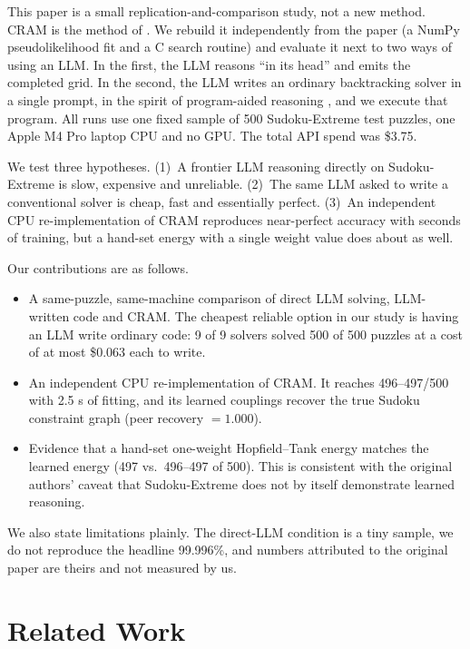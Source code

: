 \documentclass{article} %
\begin{document}
This paper is a small replication-and-comparison study, not a new method. CRAM is the method of \citet{hoover2026cram}. We rebuild it independently from the paper (a NumPy pseudolikelihood fit and a C search routine) and evaluate it next to two ways of using an LLM. In the first, the LLM reasons ``in its head'' and emits the completed grid. In the second, the LLM writes an ordinary backtracking solver in a single prompt, in the spirit of program-aided reasoning \citep{gao2023pal,chen2022pot}, and we execute that program. All runs use one fixed sample of 500 Sudoku-Extreme test puzzles, one Apple M4 Pro laptop CPU and no GPU. The total API spend was \$3.75.

We test three hypotheses. (1)~A frontier LLM reasoning directly on Sudoku-Extreme is slow, expensive and unreliable. (2)~The same LLM asked to write a conventional solver is cheap, fast and essentially perfect. (3)~An independent CPU re-implementation of CRAM reproduces near-perfect accuracy with seconds of training, but a hand-set energy with a single weight value does about as well.

Our contributions are as follows.
\begin{itemize}
\item A same-puzzle, same-machine comparison of direct LLM solving, LLM-written code and CRAM. The cheapest reliable option in our study is having an LLM write ordinary code: 9 of 9 solvers solved 500 of 500 puzzles at a cost of at most \$0.063 each to write.
\item An independent CPU re-implementation of CRAM. It reaches 496--497/500 with 2.5 s of fitting, and its learned couplings recover the true Sudoku constraint graph (peer recovery $=1.000$).
\item Evidence that a hand-set one-weight Hopfield--Tank energy matches the learned energy (497 vs.\ 496--497 of 500). This is consistent with the original authors' caveat that Sudoku-Extreme does not by itself demonstrate learned reasoning.
\end{itemize}
We also state limitations plainly. The direct-LLM condition is a tiny sample, we do not reproduce the headline 99.996\%, and numbers attributed to the original paper are theirs and not measured by us.

\section{Related Work}
\label{sec:related_work}
\end{document}
